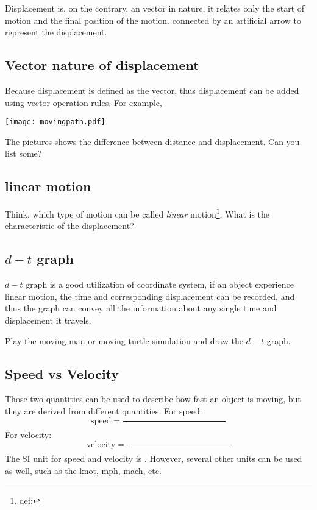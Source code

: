 \documentclass[a4paper]{tufte-handout}
\begin{document}
Displacement is, on the contrary, an vector in nature, it relates only the start of motion and the final position of the motion. connected by an artificial arrow to represent the displacement.

\subsection{Vector nature of displacement}
Because displacement is defined as the vector, thus displacement can be added using vector operation rules. For example,
\begin{figure*}
\texttt{[image: movingpath.pdf]}
\end{figure*}
The pictures shows the difference between distance and displacement. Can you list some?


\subsection{linear motion}
Think, which type of motion can be called \emph{linear} motion\footnote{def:}. What is the characteristic of the displacement?

\subsection{$d-t$ graph}
$d-t$ graph is a good utilization of coordinate system, if an object experience linear motion, the time and corresponding displacement can be recorded, and thus the graph can convey all the information about any single time and displacement it travels.

Play the \href{https://phet.colorado.edu/en/simulations/legacy/moving-man/:simulation}{moving man} or \href{https://teacher.desmos.com}{moving turtle} simulation and draw the $d-t$ graph.

\subsection{Speed vs Velocity}
Those two quantities can be used to describe how fast an object is moving, but they are derived from different quantities.
For speed:
\[
  \text{speed} = \frac{\hspace{2in}}{}
\]
For velocity:
\[
  \text{velocity} = \frac{\hspace{2in}}{}
\]
The SI unit for speed and velocity is \uline{\hspace{0.2 in}}. However, several other units can be used as well, such as the knot, mph, mach, etc. 
\end{document}
